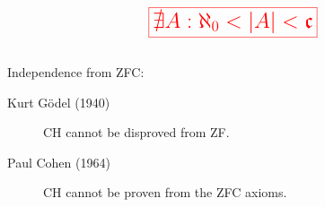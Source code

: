 
\begin{frame}{}
  \begin{center}
  \end{center}

  \[
    \red{\fbox{\text{\LARGE $\nexists A: \aleph_{0} < |A| < \mathfrak{c}$}}}
  \]
\end{frame}

\begin{frame}{}
  \begin{columns}
  \end{columns}

  \begin{center}
    {\leftpointright\; }
  \end{center}

  \pause
  Independence from ZFC: \\[1pt]
  \begin{description}
    \item[Kurt G\"odel (1940)] CH cannot be disproved from ZF.
    \item[Paul Cohen (1964)] CH cannot be proven from the ZFC axioms.
  \end{description}
\end{frame}
